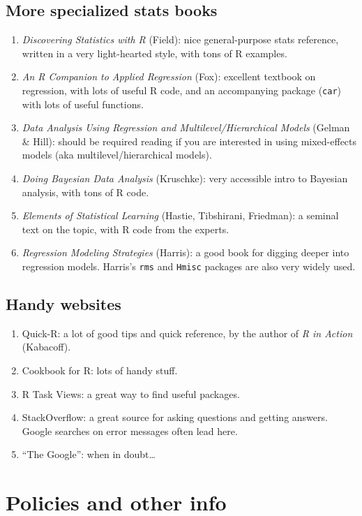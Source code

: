 \documentclass{tufte-handout}
\begin{document}
\subsection*{More specialized stats books}
\label{sec-7-3}

\begin{enumerate}
\item \emph{Discovering Statistics with R} (Field): nice general-purpose stats reference, written in a very light-hearted style, with tons of R examples.
\item \emph{An R Companion to Applied Regression} (Fox): excellent textbook on regression, with lots of useful R code, and an accompanying package (\texttt{car}) with lots of useful functions.
\item \emph{Data Analysis Using Regression and Multilevel/Hierarchical Models} (Gelman \& Hill): should be required reading if you are interested in using mixed-effects models (aka multilevel/hierarchical models).
\item \emph{Doing Bayesian Data Analysis} (Kruschke): very accessible intro to Bayesian analysis, with tons of R code.
\item \emph{Elements of Statistical Learning} (Hastie, Tibshirani, Friedman): a seminal text on the topic, with R code from the experts.
\item \emph{Regression Modeling Strategies} (Harris): a good book for digging deeper into regression models. Harris's \texttt{rms} and \texttt{Hmisc} packages are also very widely used.
\end{enumerate}
\subsection*{Handy websites}
\label{sec-7-4}

\begin{enumerate}
\item Quick-R: a lot of good tips and quick reference, by the author of \emph{R in Action} (Kabacoff).
\item Cookbook for R: lots of handy stuff.
\item R Task Views: a great way to find useful packages.
\item StackOverflow: a great source for asking questions and getting answers.  Google searches on error messages often lead here.
\item ``The Google'': when in doubt\ldots{}
\end{enumerate}
\section*{Policies and other info}
\label{sec-8}
\end{document}

